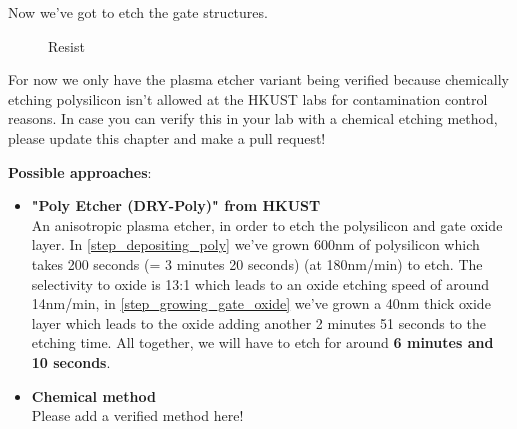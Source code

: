 Now we've got to etch the gate structures.

\begin{figure}[H]
	\centering
	\begin{tikzpicture}[node distance = 3cm, auto, thick,scale=\CrossAndTopSection, every node/.style={transform shape}]
		
	\end{tikzpicture}
	\begin{tikzpicture}[node distance = 3cm, auto, thick,scale=\CrossAndTopSection, every node/.style={transform shape}]
		
	\end{tikzpicture}
	\drawStepArrow{}
	\begin{tikzpicture}[node distance = 3cm, auto, thick,scale=\CrossAndTopSection, every node/.style={transform shape}]
		
	\end{tikzpicture}
	\begin{tikzpicture}[node distance = 3cm, auto, thick,scale=\CrossAndTopSection, every node/.style={transform shape}]
		
	\end{tikzpicture}
	\caption{Resist}
\end{figure}

\begin{mdframed}[linewidth=2pt,linecolor=red]
For now we only have the plasma etcher variant being verified because chemically etching polysilicon isn't allowed at the HKUST labs for contamination control reasons.
In case you can verify this in your lab with a chemical etching method, please update this chapter and make a pull request!
\end{mdframed}

\textbf{Possible approaches}:
\begin{itemize}
	\item \textbf{"Poly Etcher (DRY-Poly)" from HKUST} \\
	An anisotropic plasma etcher, in order to etch the polysilicon and gate oxide layer.
	In \autoref{step_depositing_poly} we've grown 600nm of polysilicon which takes 200 seconds (= 3 minutes 20 seconds) (at 180nm/min) to etch.
	The selectivity to oxide is 13:1 which leads to an oxide etching speed of around 14nm/min, in \autoref{step_growing_gate_oxide} we've grown a 40nm thick oxide layer which leads to the oxide adding another 2 minutes 51 seconds to the etching time.
	All together, we will have to etch for around \textbf{6 minutes and 10 seconds}.
	\item \textbf{Chemical method} \\
	Please add a verified method here!
\end{itemize}

